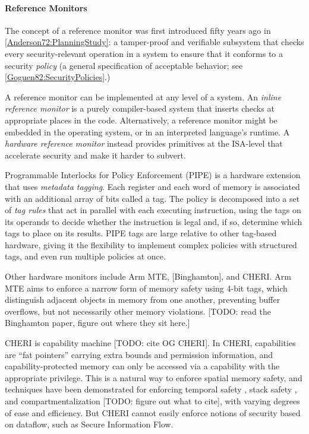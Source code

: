 \documentclass[acmsmall,review,anonymous]{acmart}\settopmatter{printfolios=true,printccs=false,printacmref=false}
\begin{document}
\paragraph{Reference Monitors}

The concept of a reference monitor was first introduced fifty years ago in \cref{Anderson72:PlanningStudy}:
a tamper-proof and verifiable subsystem that checks every security-relevant operation in a system to
ensure that it conforms to a security {\em policy} (a general specification of acceptable behavior;
see \cref{Goguen82:SecurityPolicies}.)

A reference monitor can be implemented at any level of a system. An {\em inline reference monitor}
is a purely compiler-based system that inserts checks at appropriate places in the code.
Alternatively, a reference monitor might be embedded in the operating system, or in an interpreted
language's runtime. A {\em hardware reference monitor} instead provides primitives at the ISA-level
that accelerate security and make it harder to subvert.

Programmable Interlocks for Policy Enforcement (PIPE) \cite{Dhawan14:PUMP} is a hardware extension
that uses {\em metadata tagging}. Each register and each word of memory is associated with
an additional array of bits called a tag. The policy is decomposed into a set of {\em tag rules}
that act in parallel with each executing instruction, using the tags on its operands to
decide whether the instruction is legal and, if so, determine which tags to place on its results.
PIPE tags are large relative to other tag-based hardware, giving it the flexibility
to implement complex policies with structured tags, and even run multiple policies at once.

Other hardware monitors include Arm MTE, [Binghamton], and CHERI.
Arm MTE aims to enforce a narrow form of memory safety using 4-bit tags, which distinguish adjacent objects
in memory from one another, preventing buffer overflows, but not necessarily other memory violations.
[TODO: read the Binghamton paper, figure out where they sit here.] 

CHERI is capability machine [TODO: cite OG CHERI]. In CHERI, capabilities
are ``fat pointers'' carrying extra bounds and permission information, and capability-protected
memory can only be accessed via a capability with the appropriate privilege. This is a natural
way to enforce spatial memory safety, and techniques have been demonstrated for enforcing
temporal safety \cite{NWF20:Cornucopia}, stack safety \cite{Skorstengaard19:stktokens},
and compartmentalization [TODO: figure out what to cite], with varying degrees of ease and
efficiency. But CHERI cannot easily enforce notions of security based on dataflow,
such as Secure Information Flow.
\end{document}
